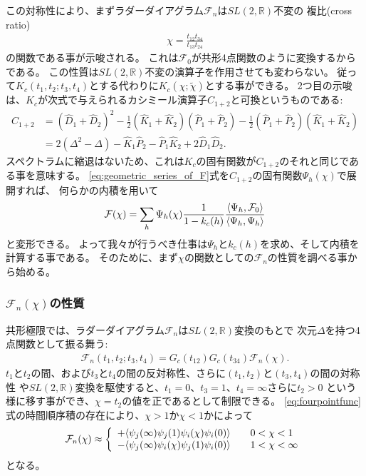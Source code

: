 この対称性により、まずラダーダイアグラム$\mathcal{F}_n$は$SL(2, \mathbb{R})$不変の
複比(cross ratio)
\begin{align}
	\chi = \frac{t_{12}t_{34}}{t_{13}t_{24}}
\end{align}
の関数である事が示唆される。
これは$\mathcal{F}_0$が共形4点関数のように変換するからである。
この性質は$SL(2, \mathbb{R})$不変の演算子を作用させても変わらない。
従って$K_c(t_1, t_2; t_3, t_4)$とする代わりに$K_c(\chi; \tilde{\chi})$とする事ができる。
2つ目の示唆は、$K_c$が次式で与えられるカシミール演算子$C_{1+2}$と可換というものである:
\begin{align}
	C_{1+2}
	&= (\hat{D}_1 + \hat{D}_2)^2
	- \frac{1}{2}(\hat{K}_1 + \hat{K}_2)(\hat{P}_1 + \hat{P}_2)
	- \frac{1}{2}(\hat{P}_1 + \hat{P}_2)(\hat{K}_1 + \hat{K}_2)\nonumber\\
	&= 2(\Delta^2 - \Delta) - \hat{K}_1\hat{P}_2 - \hat{P}_1\hat{K}_2 + 2\hat{D}_1\hat{D}_2.
	\label{eq:casimir_operator}
\end{align}
スペクトラムに縮退はないため、これは$K_c$の固有関数が$C_{1+2}$のそれと同じである事を意味する。
\eqref{eq:geometric_series_of_F}式を$C_{1+2}$の固有関数$\Psi_h(\chi)$で展開すれば、
何らかの内積を用いて
\begin{align}
	\mathcal{F}(\chi)
	= \sum_h \Psi_h(\chi)\frac{1}{1 - k_c(h)}
		\frac{\langle \Psi_h, \mathcal{F}_0 \rangle}{\langle \Psi_h, \Psi_h \rangle}
	\label{eq:final_F_chi}
\end{align}
と変形できる。
よって我々が行うべき仕事は$\Psi_h$と$k_c(h)$を求め、そして内積を計算する事である。
そのために、まず$\chi$の関数としての$\mathcal{F}_n$の性質を調べる事から始める。

\subsubsection{$\mathcal{F}_n(\chi)$の性質}
共形極限では、ラダーダイアグラム$\mathcal{F}_n$は$SL(2, \mathbb{R})$変換のもとで
次元$\Delta$を持つ4点関数として振る舞う:
\begin{align}
	\mathcal{F}_n(t_1, t_2; t_3, t_4)
	= G_c(t_{12})G_c(t_{34})\mathcal{F}_n(\chi).
\end{align}
$t_1$と$t_2$の間、および$t_3$と$t_4$の間の反対称性、さらに$(t_1, t_2)$と$(t_3, t_4)$の間の対称性
や$SL(2, \mathbb{R})$変換を駆使すると、$t_1 = 0$、$t_3 = 1$、$t_4 = \infty$さらに$t_2 > 0$
という様に移す事ができ、$\chi = t_2$の値を正であるとして制限できる。
\eqref{eq:fourpointfunc}式の時間順序積の存在により、$\chi > 1$か$\chi < 1$かによって
\begin{align}
	\mathcal{F}_n(\chi)
	\approx \left\{
		\begin{array}{l}
			+\langle \psi_j(\infty)\psi_j(1)\psi_i(\chi)\psi_i(0) \rangle\hspace{20pt}
			0 < \chi < 1\\
			-\langle \psi_j(\infty)\psi_i(\chi)\psi_j(1)\psi_i(0) \rangle\hspace{20pt}
			1 < \chi < \infty
		\end{array}
	\right.
\end{align}
となる。

